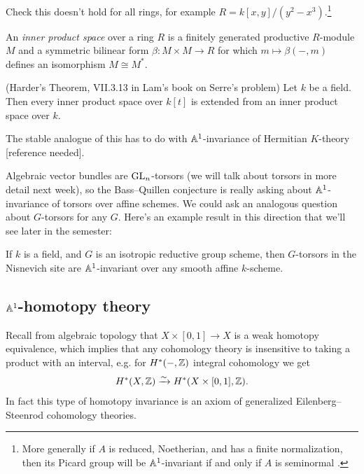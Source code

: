 \documentclass[11pt,openany]{book}
\begin{document}
\begin{example} \cite[3.7.1.5]{Aravind}
Check this doesn't hold for all rings, for example $R = k[x,y]/(y^2-x^3)$.\footnote{%
More generally if $A$ is reduced, Noetherian, and has a finite normalization, then its Picard group will be $\mathbb{A}^1$-invariant if and only if $A$ is seminormal \cite[3.6]{Traverso}.
}
\end{example}

\begin{definition} An \textit{inner product space} over a ring $R$ is a finitely generated productive $R$-module $M$ and a symmetric bilinear form $\beta \colon M \times M \to R$ for which $m \mapsto \beta(-,m)$ defines an isomorphism $M \cong M^\ast$.
\end{definition}


\begin{theorem} (Harder's Theorem, VII.3.13 in Lam's book on Serre's problem) Let $k$ be a field. Then every inner product space over $k[t]$ is extended from an inner product space over $k$.
\end{theorem}

\begin{remark} The stable analogue of this has to do with $\mathbb{A}^1$-invariance of Hermitian $K$-theory [reference needed].
\end{remark}



Algebraic vector bundles are $\mathrm{GL}_n$-torsors (we will talk about torsors in more detail next week), so the Bass--Quillen conjecture is really asking about $\mathbb{A}^1$-invariance of torsors over affine schemes. We could ask an analogous question about $G$-torsors for any $G$. Here's an example result in this direction that we'll see later in the semester:

\begin{theorem} \cite[1.3]{AHW3} If $k$ is a field, and $G$ is an isotropic reductive group scheme, then $G$-torsors in the Nisnevich site are $\mathbb{A}^1$-invariant over any smooth affine $k$-scheme.
\end{theorem}

\subsection{$\mathbb{A}^1$-homotopy theory}

Recall from algebraic topology that $X \times [0,1] \to X$ is a weak homotopy equivalence, which implies that any cohomology theory is insensitive to taking a product with an interval, e.g. for $H^\ast(-,\mathbb{Z})$ integral cohomology we get
\begin{align*}
    H^\ast(X,\mathbb{Z}) \xrightarrow{\sim} H^\ast(X \times [0,1],\mathbb{Z}).
\end{align*}
In fact this type of homotopy invariance is an axiom of generalized Eilenberg--Steenrod cohomology theories.
\end{document}
